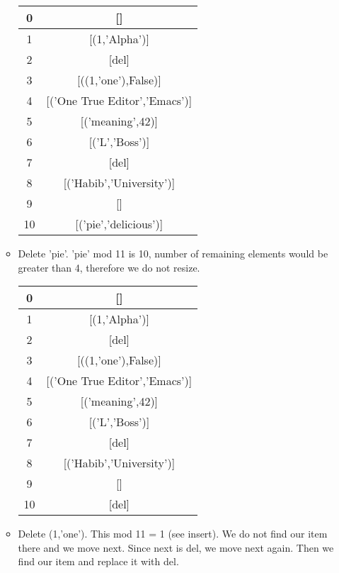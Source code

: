\documentclass{article}
\begin{document}
\begin{enumerate}
\begin{itemize}
\begin{center}
\begin{tabular}{ |c|c| }
							\hline
							0 & []   \\ 
							\hline
							1 &	[(1,'Alpha')] \\
							\hline 
							2 & [del]  \\ 
							\hline
							3&[((1,'one'),False)]\\
							\hline
							4&[('One True Editor','Emacs')]\\
							\hline
							5&[('meaning',42)]\\
							\hline
							6&[('L','Boss')]\\
							\hline
							7&[del]\\
							\hline
							8&[('Habib','University')]\\
							\hline
							9&[]\\
							\hline
							10&[('pie','delicious')]\\
							\hline
						\end{tabular}
					\end{center}
			\item Delete 'pie'. 'pie' mod 11 is 10, number of remaining elements would be greater than 4, therefore we do not resize.
					\begin{center}
						\begin{tabular}{ |c|c| } 
							\hline
							0 & []   \\ 
							\hline
							1 &	[(1,'Alpha')] \\
							\hline 
							2 & [del]  \\ 
							\hline
							3&[((1,'one'),False)]\\
							\hline
							4&[('One True Editor','Emacs')]\\
							\hline
							5&[('meaning',42)]\\
							\hline
							6&[('L','Boss')]\\
							\hline
							7&[del]\\
							\hline
							8&[('Habib','University')]\\
							\hline
							9&[]\\
							\hline
							10&[del]\\
							\hline
						\end{tabular}
					\end{center}
			\item Delete (1,'one'). This mod 11 = 1 (see insert). We do not find our item there and we move next. Since next is del, we move next again. Then we find our item and replace it with del.
			\begin{center}

\end{center}
\end{itemize}
\end{enumerate}
\end{document}
